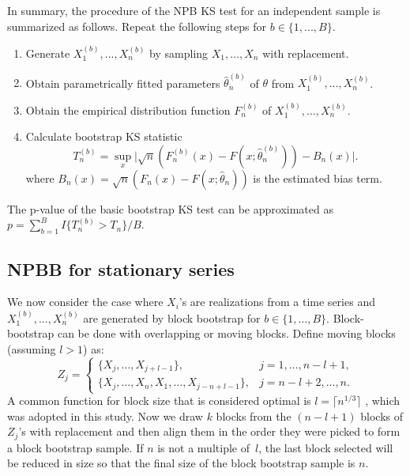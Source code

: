 \documentclass[APA,Times1COL]{WileyNJDv5} %
\begin{document}
In summary, the procedure of the NPB KS test for an independent sample is
summarized as follows. Repeat the following steps for $b \in \{1, ..., B\}$.
\begin{enumerate}
\item
  Generate $X^{(b)}_1,...,X^{(b)}_n$ by sampling $X_1, \ldots, X_n$
  with replacement.
\item
  Obtain parametrically
  fitted parameters 
	$\hat\theta^{(b)}_n$ of $\theta$ from $X^{(b)}_1,...,X^{(b)}_n$.  
\item
  Obtain the empirical distribution function $F^{(b)}_n$ of
  $X^{(b)}_1,...,X^{(b)}_n$. 
\item
  Calculate bootstrap KS statistic
  \[
    T^{(b)}_n = \sup_x \Big\vert \sqrt{n}\left(F^{(b)}_n(x) 
    - F(x; \hat\theta^{(b)}_n)\right) - B_n(x) \Big\vert.
  \]
  where 
  $B_{n}(x) = \sqrt{n}(F_n(x) - F(x; \hat\theta_n))$ is the estimated
  bias term.
\end{enumerate}


The p-value of the basic bootstrap KS test can be approximated
as $p = \sum_{b=1}^B I\{T^{(b)}_n > T_n\} / B$.


\subsection{NPBB for stationary series}
\label{sub:npbb}

We now consider the case where $X_i$'s are realizations from a time series and
$X^{(b)}_1,...,X^{(b)}_n$ are generated by block bootstrap for 
$b \in \{1, \ldots, B\}$.  
Block-bootstrap can be done with overlapping or moving blocks.
Define moving blocks (assuming $l > 1$) as:
\begin{equation*}
Z_j =
    \begin{cases}
        \{X_j, \ldots, X_{j + l - 1}\}, & j = 1, \dots, n - l + 1,\\
        \{X_j, \ldots, X_n, X_1, \ldots, X_{j-n+l-1}\}, & j = n - l
        + 2 ,\dots, n.
    \end{cases}
\end{equation*}
A common 
function for block size that is considered optimal is 
$l = \lceil n^{1/3} \rceil$ \citep{buhlmann1999block},  
which was adopted in this study.
Now we draw $k$ blocks from the $(n - l + 1)$ blocks 
of $Z_j$'s with replacement and then align them in the order they were picked to
form a block bootstrap sample. If $n$ is not a multiple of~$l$, the last block 
selected will be reduced in size so that the final size of the block bootstrap 
sample is $n$.
\end{document}
